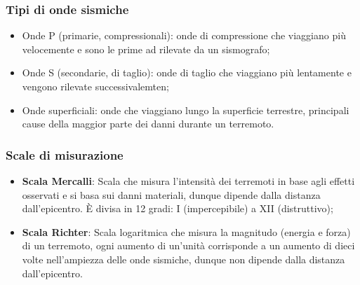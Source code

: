 \documentclass{article}
\begin{document}
\subsubsection{Tipi di onde sismiche}
\begin{itemize}
    \item Onde P (primarie, compressionali): onde di compressione che viaggiano più velocemente
        e sono le prime ad rilevate da un sismografo;
    \item Onde S (secondarie, di taglio): onde di taglio che viaggiano più lentamente e vengono
        rilevate successivalemten;
    \item Onde superficiali: onde che viaggiano lungo la superficie terrestre, principali
        cause della maggior parte dei danni durante un terremoto.
\end{itemize}

\subsubsection{Scale di misurazione}
\begin{itemize}
    \item \textbf{Scala Mercalli}: Scala che misura l'intensità dei terremoti in base agli
        effetti osservati e si basa sui danni materiali, dunque dipende dalla distanza
        dall'epicentro. È divisa in 12 gradi: I (impercepibile) a XII (distruttivo);
    \item \textbf{Scala Richter}: Scala logaritmica che misura la magnitudo (energia e forza)
        di un terremoto, ogni aumento di un'unità corrisponde a un aumento di dieci volte
        nell'ampiezza delle onde sismiche, dunque non dipende dalla distanza dall'epicentro.
\end{itemize}
\end{document}
